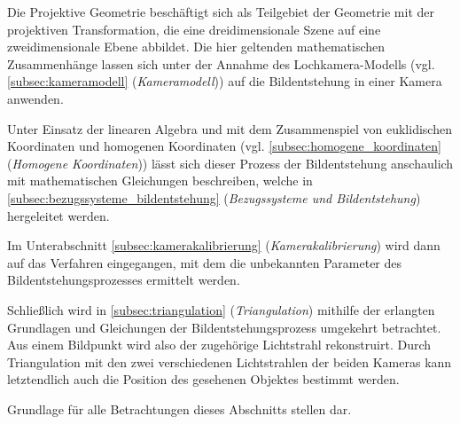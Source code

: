 Die Projektive Geometrie beschäftigt sich als Teilgebiet der Geometrie mit der projektiven Transformation, die eine dreidimensionale Szene auf eine zweidimensionale Ebene abbildet. Die hier geltenden mathematischen Zusammenhänge lassen sich unter der Annahme des Lochkamera-Modells (vgl. \ref{subsec:kameramodell} (\emph{Kameramodell})) auf die Bildentstehung in einer Kamera anwenden.\kleinerabstand

\noindent Unter Einsatz der linearen Algebra und mit dem Zusammenspiel von euklidischen Koordinaten und homogenen Koordinaten (vgl. \ref{subsec:homogene_koordinaten} (\emph{Homogene Koordinaten})) lässt sich dieser Prozess der Bildentstehung anschaulich mit mathematischen Gleichungen beschreiben, welche in \ref{subsec:bezugssysteme_bildentstehung} (\emph{Bezugssysteme und Bildentstehung}) hergeleitet werden.\kleinerabstand

\noindent Im Unterabschnitt \ref{subsec:kamerakalibrierung} (\emph{Kamerakalibrierung}) wird dann auf das Verfahren eingegangen, mit dem die unbekannten Parameter des Bildentstehungsprozesses ermittelt werden.\kleinerabstand

\noindent Schließlich wird in \ref{subsec:triangulation} (\emph{Triangulation}) mithilfe der erlangten Grundlagen und Gleichungen der Bildentstehungsprozess umgekehrt betrachtet. Aus einem Bildpunkt wird also der zugehörige Lichtstrahl rekonstruirt. Durch Triangulation mit den zwei verschiedenen Lichtstrahlen der beiden Kameras kann letztendlich auch die Position des gesehenen Objektes bestimmt werden.\kleinerabstand

\noindent Grundlage für alle Betrachtungen dieses Abschnitts stellen \cite{cyrill_stachniss_hc, cyrill_stachniss_cei, cyrill_stachniss_dlt} dar.